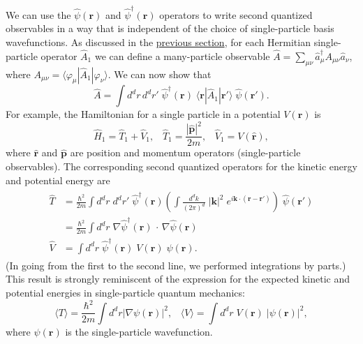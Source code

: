 \documentclass[pra,12pt]{revtex4}
\begin{document}
We can use the $\hat{\psi}(\mathbf{r})$ and
$\hat{\psi}^\dagger(\mathbf{r})$ operators to write second quantized
observables in a way that is independent of the choice of
single-particle basis wavefunctions.  As discussed in the
\hyperref[sec:second_quant_op]{previous section}, for each Hermitian
single-particle operator $\hat{A}_1$ we can define a many-particle
observable $\hat{A} = \sum_{\mu\nu} \hat{a}^\dagger_\mu A_{\mu\nu}
\hat{a}_\nu$, where $A_{\mu\nu} =
\langle\varphi_\mu|\hat{A}_1|\varphi_\nu\rangle$.  We can now show
that
\begin{equation}
  \hat{A} = \int d^dr \,d^dr' \;\hat{\psi}^\dagger(\mathbf{r}) \;\langle \mathbf{r}|\hat{A}_1|\mathbf{r}'\rangle \; \hat{\psi}(\mathbf{r}').
\end{equation}
For example, the Hamiltonian for a single particle in a potential
$V(\mathbf{r})$ is
\begin{equation}
  \hat{H}_1 = \hat{T}_1 + \hat{V}_1, \;\;\; \hat{T}_1 = \frac{|\hat{\mathbf{p}}|^2}{2m}, \;\;\; \hat{V}_1 = V(\hat{\mathbf{r}}),
\end{equation}
where $\hat{\mathbf{r}}$ and $\hat{\mathbf{p}}$ are position and
momentum operators (single-particle observables).  The corresponding
second quantized operators for the kinetic energy and potential energy
are
\begin{align}
  \begin{aligned}\hat{T} &= \frac{\hbar^2}{2m} \int d^dr\; d^dr'\; \hat{\psi}^\dagger(\mathbf{r}) \left(\int\frac{d^dk}{(2\pi)^d} \; |\mathbf{k}|^2 \; e^{i\mathbf{k}\cdot(\mathbf{r}-\mathbf{r}')}\right) \; \hat{\psi}(\mathbf{r}') \\ &= \frac{\hbar^2}{2m} \int d^d r\; \nabla \hat{\psi}^\dagger (\mathbf{r}) \, \cdot \, \nabla \hat{\psi}(\mathbf{r}) \\ \hat{V} &= \int d^dr \;\hat{\psi}^\dagger(\mathbf{r}) \;V(\mathbf{r}) \; \hat{\psi}(\mathbf{r}).\end{aligned}
\end{align}
(In going from the first to the second line, we performed integrations
by parts.)  This result is strongly reminiscent of the expression for
the expected kinetic and potential energies in single-particle quantum
mechanics:
\begin{equation}
  \langle T\rangle = \frac{\hbar^2}{2m} \int d^d r \left|\nabla\psi(\mathbf{r})\right|^2, \;\;\; \langle V\rangle = \int d^dr \; V(\mathbf{r}) \; |\psi(\mathbf{r})|^2,
\end{equation}
where $\psi(\mathbf{r})$ is the single-particle wavefunction.
\end{document}

